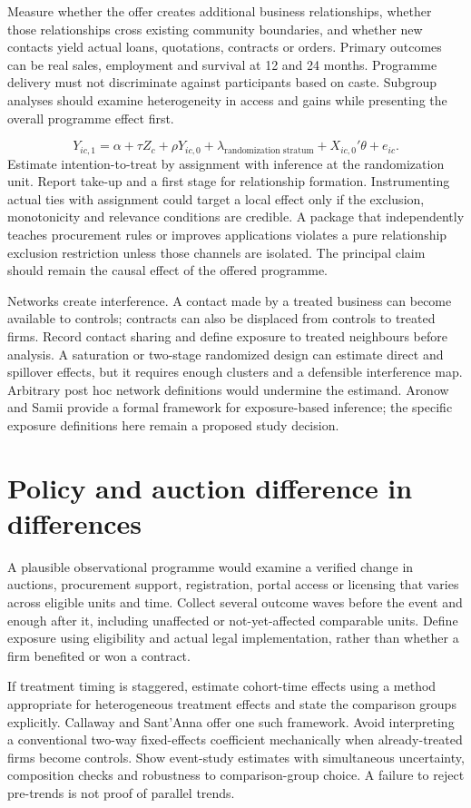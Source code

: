 \documentclass[11pt,a4paper]{report}
\begin{document}
Measure whether the offer creates additional business relationships, whether those relationships cross existing community boundaries, and whether new contacts yield actual loans, quotations, contracts or orders. Primary outcomes can be real sales, employment and survival at 12 and 24 months. Programme delivery must not discriminate against participants based on caste. Subgroup analyses should examine heterogeneity in access and gains while presenting the overall programme effect first.

\[
Y_{ic,1}=\alpha+\tau Z_c+\rho Y_{ic,0}
+\lambda_{\text{randomization stratum}}+X_{ic,0}'\theta+e_{ic}.
\]
Estimate intention-to-treat by assignment with inference at the randomization unit. Report take-up and a first stage for relationship formation. Instrumenting actual ties with assignment could target a local effect only if the exclusion, monotonicity and relevance conditions are credible. A package that independently teaches procurement rules or improves applications violates a pure relationship exclusion restriction unless those channels are isolated. The principal claim should remain the causal effect of the offered programme.

Networks create interference. A contact made by a treated business can become available to controls; contracts can also be displaced from controls to treated firms. Record contact sharing and define exposure to treated neighbours before analysis. A saturation or two-stage randomized design can estimate direct and spillover effects, but it requires enough clusters and a defensible interference map. Arbitrary post hoc network definitions would undermine the estimand. Aronow and Samii provide a formal framework for exposure-based inference; the specific exposure definitions here remain a proposed study decision.

\section{Policy and auction difference in differences}
A plausible observational programme would examine a verified change in auctions, procurement support, registration, portal access or licensing that varies across eligible units and time. Collect several outcome waves before the event and enough after it, including unaffected or not-yet-affected comparable units. Define exposure using eligibility and actual legal implementation, rather than whether a firm benefited or won a contract.

If treatment timing is staggered, estimate cohort-time effects using a method appropriate for heterogeneous treatment effects and state the comparison groups explicitly. Callaway and Sant'Anna offer one such framework. Avoid interpreting a conventional two-way fixed-effects coefficient mechanically when already-treated firms become controls. Show event-study estimates with simultaneous uncertainty, composition checks and robustness to comparison-group choice. A failure to reject pre-trends is not proof of parallel trends.
\end{document}
